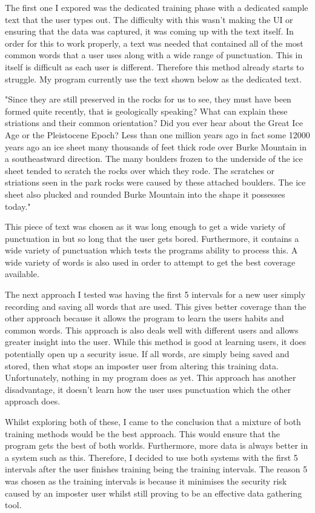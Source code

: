 \documentclass[10pt,a4paper]{report}
\begin{document}
The first one I expored was the dedicated training phase with a dedicated sample text that the user types out. The difficulty with this wasn't making the UI or ensuring that the data was captured, it was coming up with the text itself. In order for this to work properly, a text was needed that contained all of the most common words that a user uses along with a wide range of  punctuation. This in itself is difficult as each user is different. Therefore this method already starts to struggle. My program currently use the text shown below as the dedicated text.

"Since they are still preserved in the rocks for us to see, they must have been formed quite recently, that is geologically speaking?
What can explain these striations and their common orientation?			
Did you ever hear about the Great Ice Age or the Pleistocene Epoch?			
Less than one million years ago	in fact	some 12000 years ago an ice sheet many thousands of feet thick rode over Burke Mountain in a southeastward direction.
The many boulders frozen to the underside of the ice sheet tended to scratch the rocks over which they rode.			
The scratches or striations seen in the park rocks were caused by these attached boulders.				
The ice sheet also plucked and rounded Burke Mountain into the shape it possesses today."

This piece of text was chosen as it was long enough to get a wide variety of punctuation in but so long that the user gets bored. Furthermore, it contains a wide variety of punctuation which tests the programs ability to process this. A wide variety of words is also used in order to attempt to get the best coverage available.

The next approach I tested was having the first 5 intervals for a new user simply recording and saving all words that are used. This gives better coverage than the other approach because it allows the program to learn the users habits and common words. This approach is also deals well with different users and allows greater insight into the user. While this method is good at learning users, it does potentially open up a security issue. If all words, are simply being saved and stored, then what stops an imposter user from altering this training data. Unfortunately, nothing in my program does as yet. This approach has another disadvantage, it doesn't learn how the user uses punctuation which the other approach does. 

Whilst exploring both of these, I came to the conclusion that a mixture of both training methods would be the best approach. This would ensure that the program gets the best of both worlds. Furthermore, more data is always better in a system such as this. Therefore, I decided to use both systems with the first 5 intervals after the user finishes training being the training intervals. The reason 5 was chosen as the training intervals is because it minimises the security risk caused by an imposter user whilst still proving to be an effective data gathering tool.
\end{document}
